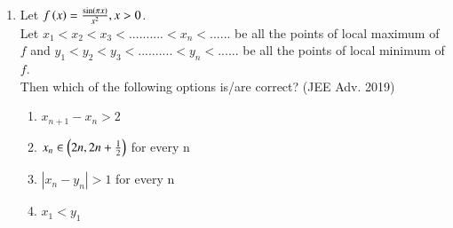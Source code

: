 \documentclass[journal]{IEEEtran}
\begin{document}
\begin{enumerate}
{        }
        
    \item{
        
            Let $f\left(x\right) = \frac{\sin\left(\pi x\right)}{x^2}, x>0$.\\[3pt]
            Let $x_1 < x_2 < x_3 < .......... <x_n <......$ be all the points of local maximum of $f$ and $y_1 < y_2 < y_3 < .......... <y_n <......$ be all the points of local minimum of $f$.\\
            Then which of the following options is/are correct?
             \hfill
                {(JEE Adv. 2019)}
            
            \begin{multicols}{2}
                \begin{enumerate}
                    \item $x_{n+1} - x_{n} > 2$ 
                    \item $x_{n} \in \left(2n, 2n+\frac{1}{2}\right)$ for every n
                    \item $|x_{n} - y_{n}|> 1 $ for every n
                    \item $x_{1} < y_{1}$
                \end{enumerate}
            \end{multicols}
        
        }
    \end{enumerate}
\end{document}

